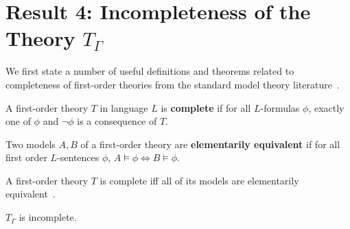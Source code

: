 \section{Result 4: Incompleteness of the Theory $T_{\Gamma}$}
\label{sec:incompleteness}

We first state a number of useful definitions and theorems related to
completeness of first-order theories from the standard model theory
literature~\cite{HodgesModelTheory}.

\begin{Definition}
A first-order theory $T$ in language $L$ is \textbf{complete} if for
all $L$-formulas $\phi$, exactly one of $\phi$ and $\lnot \phi$ is a
consequence of $T$.
\end{Definition}

\begin{Definition}
Two models $A, B$ of a first-order theory are \textbf{elementarily
  equivalent} if for all first order $L$-sentences $\phi$, $A \vDash
\phi \iff B \vDash \phi$.
\end{Definition}

\begin{Theorem}
\label{thm:completeIffEquivalent}
A first-order theory $T$ is complete iff all of its models
are elementarily equivalent~\cite{HodgesModelTheory}.
\end{Theorem}


\begin{Theorem}
$T_{\Gamma}$ is incomplete.
\end{Theorem}

